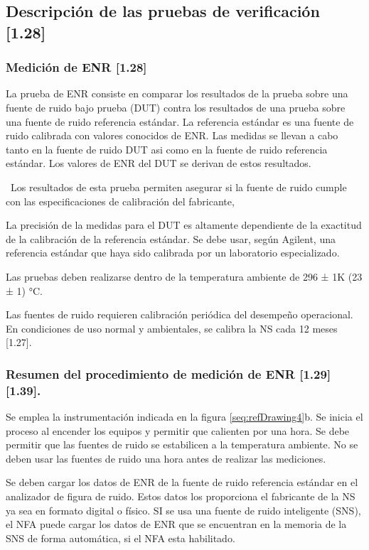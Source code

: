 \documentclass[paper=letter,oneside,fontsize=10pt,parskip=full]{article}
\newcounter{Drawing}
\begin{document}
\bigskip

\subsection[Descripción de las pruebas de verificación [1.28{]}]{Descripción de las pruebas de verificación [1.28]}
\subsubsection[Medición de ENR [1.28{]}]{Medición de ENR [1.28]}
La prueba de ENR consiste en comparar los resultados de la prueba sobre una fuente de ruido bajo prueba (DUT) contra los
resultados de una prueba sobre una fuente de ruido referencia estándar. La referencia estándar es una fuente de ruido
calibrada con valores conocidos de ENR. Las medidas se llevan a cabo tanto en la fuente de ruido DUT asi como en la
fuente de ruido referencia estándar. Los valores de ENR del DUT se derivan de estos resultados. \ 

\ Los resultados de esta prueba permiten asegurar si la fuente de ruido cumple con las especificaciones de calibración
del fabricante,

La precisión de la medidas para el DUT es altamente dependiente de la exactitud de la calibración de la referencia
estándar. Se debe usar, según Agilent, una referencia estándar que haya sido calibrada por un laboratorio
especializado.

Las pruebas deben realizarse dentro de la temperatura ambiente de 296 ± 1K (23 ± 1) °C.

Las fuentes de ruido requieren calibración periódica del desempeño operacional. En condiciones de uso normal y
ambientales, se calibra la NS cada 12 meses [1.27].

\subsubsection[Resumen del procedimiento de medición de ENR [1.29{]} [1.39{]}.]{Resumen del procedimiento de medición de
ENR [1.29] [1.39].}
Se emplea la instrumentación indicada en la figura \ref{seq:refDrawing4}b. Se inicia el proceso al encender los equipos
y permitir que calienten por una hora. Se debe permitir que las fuentes de ruido se estabilicen a la temperatura
ambiente. No se deben usar las fuentes de ruido una hora antes de realizar las mediciones.

Se deben cargar los datos de ENR de la fuente de ruido referencia estándar en el analizador de figura de ruido. Estos
datos los proporciona el fabricante de la NS ya sea en formato digital o físico. SI se usa una fuente de ruido
inteligente (SNS), el NFA puede cargar los datos de ENR que se encuentran en la memoria de la SNS de forma automática,
si el NFA esta habilitado.
\end{document}
